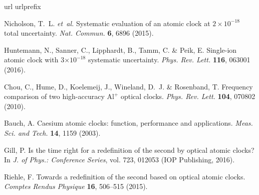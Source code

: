 \documentclass[pra,aps,showpacs,floatfix,twocolumn,nofootinbib,citeautoscript]{revtex4-1}
\begin{document}
\begin{thebibliography}{10}
\expandafter\ifx\csname url\endcsname\relax
  \def\url#1{\texttt{#1}}\fi
\expandafter\ifx\csname urlprefix\endcsname\relax\def\urlprefix{URL }\fi
\providecommand{\bibinfo}[2]{#2}
\providecommand{\eprint}[2][]{\url{#2}}

\bibinfo{author}{Nicholson, T.~L.} \emph{et~al.}
\newblock \bibinfo{title}{Systematic evaluation of an atomic clock at $2 \times
  10^{-18}$ total uncertainty}.
\newblock \emph{\bibinfo{journal}{Nat. Commun.}} \textbf{\bibinfo{volume}{6}},
  \bibinfo{pages}{6896} (\bibinfo{year}{2015}).

\bibinfo{author}{Huntemann, N.}, \bibinfo{author}{Sanner, C.},
  \bibinfo{author}{Lipphardt, B.}, \bibinfo{author}{Tamm, C.} \&
  \bibinfo{author}{Peik, E.}
\newblock \bibinfo{title}{Single-ion atomic clock with 3$\times10^{-18}$
  systematic uncertainty}.
\newblock \emph{\bibinfo{journal}{Phys. Rev. Lett.}}
  \textbf{\bibinfo{volume}{116}}, \bibinfo{pages}{063001}
  (\bibinfo{year}{2016}).

\bibinfo{author}{Chou, C.}, \bibinfo{author}{Hume, D.},
  \bibinfo{author}{Koelemeij, J.}, \bibinfo{author}{Wineland, D.~J.} \&
  \bibinfo{author}{Rosenband, T.}
\newblock \bibinfo{title}{Frequency comparison of two high-accuracy
  $\text{Al}^+$ optical clocks}.
\newblock \emph{\bibinfo{journal}{Phys. Rev. Lett.}}
  \textbf{\bibinfo{volume}{104}}, \bibinfo{pages}{070802}
  (\bibinfo{year}{2010}).

\bibinfo{author}{Bauch, A.}
\newblock \bibinfo{title}{Caesium atomic clocks: function, performance and
  applications}.
\newblock \emph{\bibinfo{journal}{Meas. Sci. and Tech.}}
  \textbf{\bibinfo{volume}{14}}, \bibinfo{pages}{1159} (\bibinfo{year}{2003}).

\bibinfo{author}{Gill, P.}
\newblock \bibinfo{title}{Is the time right for a redefinition of the second by
  optical atomic clocks?}
\newblock In \emph{\bibinfo{booktitle}{J. of Phys.: Conference Series}}, vol.
  \bibinfo{volume}{723}, \bibinfo{pages}{012053} (\bibinfo{organization}{IOP
  Publishing}, \bibinfo{year}{2016}).

\bibinfo{author}{Riehle, F.}
\newblock \bibinfo{title}{Towards a redefinition of the second based on optical
  atomic clocks}.
\newblock \emph{\bibinfo{journal}{Comptes Rendus Physique}}
  \textbf{\bibinfo{volume}{16}}, \bibinfo{pages}{506--515}
  (\bibinfo{year}{2015}).


\end{thebibliography}
\end{document}
